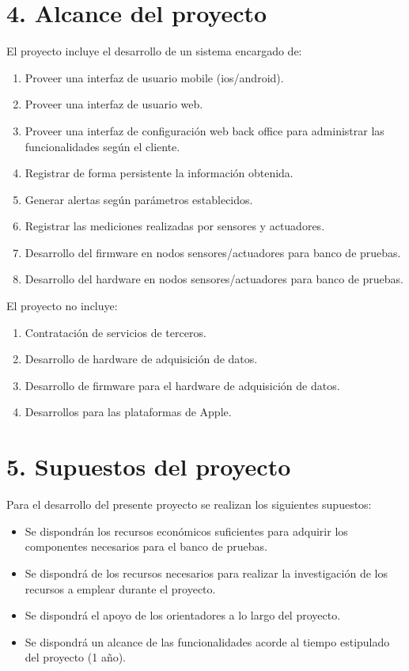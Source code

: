 \documentclass[
11pt, %
]{charter}
\begin{document}
\section{4. Alcance del proyecto}
\label{sec:alcance}

El proyecto incluye el desarrollo de un sistema encargado de:
\begin{enumerate}
\item Proveer una interfaz de usuario mobile (ios/android).
\item Proveer una interfaz de usuario web.
\item Proveer una interfaz de configuración web back office para administrar las funcionalidades según el cliente.
\item Registrar de forma persistente la información obtenida.
\item Generar alertas según parámetros establecidos.
\item Registrar las mediciones realizadas por sensores y actuadores.
\item Desarrollo del firmware en nodos sensores/actuadores para banco de pruebas.
\item Desarrollo del hardware en nodos sensores/actuadores para banco de pruebas.
\end{enumerate}

El proyecto no incluye:
\begin{enumerate}
\item Contratación de servicios de terceros.
\item Desarrollo de hardware de adquisición de datos.
\item Desarrollo de firmware para el hardware de adquisición de datos.
\item Desarrollos para las plataformas de Apple.
\end{enumerate}

\section{5. Supuestos del proyecto}

Para el desarrollo del presente proyecto se realizan los siguientes supuestos:
\begin{itemize}
	\item Se dispondrán los recursos económicos suficientes para adquirir los componentes necesarios para el banco de pruebas.
	\item Se dispondrá de los recursos necesarios para realizar la investigación de los recursos a emplear durante el proyecto.
	 \item Se dispondrá el apoyo de los orientadores a lo largo del proyecto.
	 \item Se dispondrá un alcance de las funcionalidades acorde al tiempo estipulado del proyecto (1 año).
\end{itemize}
\end{document}
